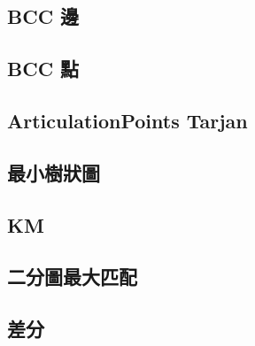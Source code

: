     \subsection{BCC 邊}
    \subsection{BCC 點}
    \subsection{ArticulationPoints Tarjan}
    \subsection{最小樹狀圖}
    \subsection{KM}
        
    \subsection{二分圖最大匹配}
        
    \subsection{差分}
